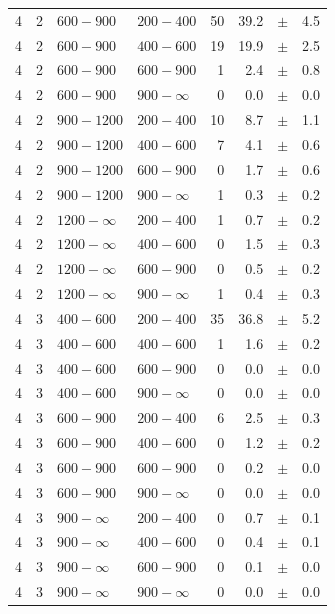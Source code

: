 \begin{table}[!h]
\begin{tabular}{rrllrrcl}
4 & 2 & $ 600- 900$ & $200-400$ &     50 &     39.2 &$\pm$&    4.5 \\
4 & 2 & $ 600- 900$ & $400-600$ &     19 &     19.9 &$\pm$&    2.5 \\
4 & 2 & $ 600- 900$ & $600-900$ &      1 &      2.4 &$\pm$&    0.8 \\
4 & 2 & $ 600- 900$ & $900-\infty$ &      0 &      0.0 &$\pm$&    0.0 \\
4 & 2 & $ 900-1200$ & $200-400$ &     10 &      8.7 &$\pm$&    1.1 \\
4 & 2 & $ 900-1200$ & $400-600$ &      7 &      4.1 &$\pm$&    0.6 \\
4 & 2 & $ 900-1200$ & $600-900$ &      0 &      1.7 &$\pm$&    0.6 \\
4 & 2 & $ 900-1200$ & $900-\infty$ &      1 &      0.3 &$\pm$&    0.2 \\
4 & 2 & $1200- \infty$ & $200-400$ &      1 &      0.7 &$\pm$&    0.2 \\
4 & 2 & $1200- \infty$ & $400-600$ &      0 &      1.5 &$\pm$&    0.3 \\
4 & 2 & $1200- \infty$ & $600-900$ &      0 &      0.5 &$\pm$&    0.2 \\
4 & 2 & $1200- \infty$ & $900-\infty$ &      1 &      0.4 &$\pm$&    0.3 \\
4 & 3 & $ 400- 600$ & $200-400$ &     35 &     36.8 &$\pm$&    5.2 \\
4 & 3 & $ 400- 600$ & $400-600$ &      1 &      1.6 &$\pm$&    0.2 \\
4 & 3 & $ 400- 600$ & $600-900$ &      0 &      0.0 &$\pm$&    0.0 \\
4 & 3 & $ 400- 600$ & $900-\infty$ &      0 &      0.0 &$\pm$&    0.0 \\
4 & 3 & $ 600- 900$ & $200-400$ &      6 &      2.5 &$\pm$&    0.3 \\
4 & 3 & $ 600- 900$ & $400-600$ &      0 &      1.2 &$\pm$&    0.2 \\
4 & 3 & $ 600- 900$ & $600-900$ &      0 &      0.2 &$\pm$&    0.0 \\
4 & 3 & $ 600- 900$ & $900-\infty$ &      0 &      0.0 &$\pm$&    0.0 \\
4 & 3 & $ 900- \infty$ & $200-400$ &      0 &      0.7 &$\pm$&    0.1 \\
4 & 3 & $ 900- \infty$ & $400-600$ &      0 &      0.4 &$\pm$&    0.1 \\
4 & 3 & $ 900- \infty$ & $600-900$ &      0 &      0.1 &$\pm$&    0.0 \\
4 & 3 & $ 900- \infty$ & $900-\infty$ &      0 &      0.0 &$\pm$&    0.0 \\
    \hline
  \end{tabular}
\end{table}

